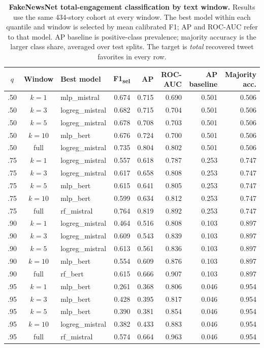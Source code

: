 \begin{table}[!ht]
\centering
\caption{{\bf FakeNewsNet total-engagement classification by text window.} Results use the same 434-story cohort at every window. The best model within each quantile and window is selected by mean calibrated F1; AP and ROC-AUC refer to that model. AP baseline is positive-class prevalence; majority accuracy is the larger class share, averaged over test splits. The target is \emph{total} recovered tweet favorites in every row.}
\label{tab:fnn-virality}
\footnotesize
\begin{tabular}{cclrrrrr}
\toprule
$q$ & Window & Best model & F1\textsubscript{sel} & AP & ROC-AUC & AP baseline & Majority acc. \\
\midrule
.50 & $k=1$ & mlp\_mistral & 0.674 & 0.715 & 0.690 & 0.501 & 0.506 \\
.50 & $k=3$ & logreg\_mistral & 0.682 & 0.715 & 0.704 & 0.501 & 0.506 \\
.50 & $k=5$ & logreg\_mistral & 0.678 & 0.708 & 0.703 & 0.501 & 0.506 \\
.50 & $k=10$ & mlp\_bert & 0.676 & 0.724 & 0.700 & 0.501 & 0.506 \\
.50 & full & logreg\_mistral & 0.735 & 0.804 & 0.802 & 0.501 & 0.506 \\
\midrule
.75 & $k=1$ & logreg\_mistral & 0.557 & 0.618 & 0.787 & 0.253 & 0.747 \\
.75 & $k=3$ & logreg\_mistral & 0.617 & 0.658 & 0.808 & 0.253 & 0.747 \\
.75 & $k=5$ & mlp\_bert & 0.615 & 0.641 & 0.805 & 0.253 & 0.747 \\
.75 & $k=10$ & mlp\_bert & 0.599 & 0.634 & 0.812 & 0.253 & 0.747 \\
.75 & full & rf\_mistral & 0.764 & 0.819 & 0.892 & 0.253 & 0.747 \\
\midrule
.90 & $k=1$ & logreg\_mistral & 0.464 & 0.516 & 0.808 & 0.103 & 0.897 \\
.90 & $k=3$ & logreg\_mistral & 0.609 & 0.543 & 0.839 & 0.103 & 0.897 \\
.90 & $k=5$ & logreg\_mistral & 0.613 & 0.561 & 0.836 & 0.103 & 0.897 \\
.90 & $k=10$ & mlp\_bert & 0.554 & 0.609 & 0.876 & 0.103 & 0.897 \\
.90 & full & rf\_bert & 0.615 & 0.666 & 0.907 & 0.103 & 0.897 \\
\midrule
.95 & $k=1$ & mlp\_bert & 0.261 & 0.368 & 0.806 & 0.046 & 0.954 \\
.95 & $k=3$ & mlp\_bert & 0.428 & 0.395 & 0.817 & 0.046 & 0.954 \\
.95 & $k=5$ & mlp\_bert & 0.390 & 0.381 & 0.854 & 0.046 & 0.954 \\
.95 & $k=10$ & logreg\_mistral & 0.382 & 0.433 & 0.883 & 0.046 & 0.954 \\
.95 & full & rf\_mistral & 0.574 & 0.664 & 0.963 & 0.046 & 0.954 \\
\bottomrule
\end{tabular}
\end{table}
